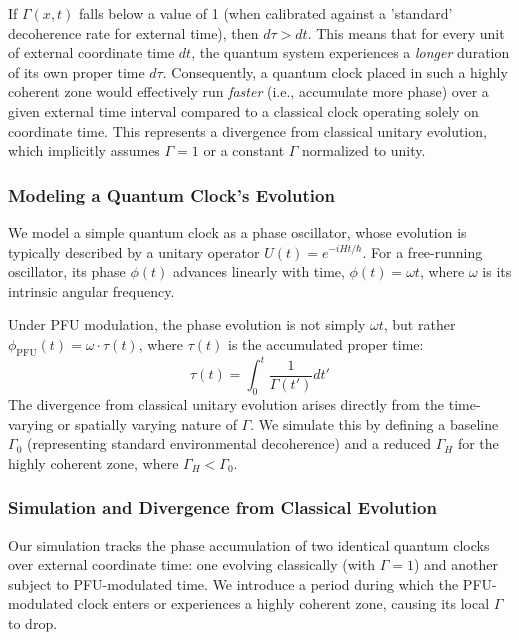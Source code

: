\documentclass[12pt,a4paper]{article}
\numberwithin{equation}{section}
\begin{document}
If $\Gamma(x, t)$ falls below a value of 1 (when calibrated against a 'standard' decoherence rate for external time), then $d\tau > dt$. This means that for every unit of external coordinate time $dt$, the quantum system experiences a \textit{longer} duration of its own proper time $d\tau$. Consequently, a quantum clock placed in such a highly coherent zone would effectively run \textit{faster} (i.e., accumulate more phase) over a given external time interval compared to a classical clock operating solely on coordinate time. This represents a divergence from classical unitary evolution, which implicitly assumes $\Gamma=1$ or a constant $\Gamma$ normalized to unity.

\subsubsection{Modeling a Quantum Clock's Evolution}
We model a simple quantum clock as a phase oscillator, whose evolution is typically described by a unitary operator $U(t) = e^{-iHt/\hbar}$. For a free-running oscillator, its phase $\phi(t)$ advances linearly with time, $\phi(t) = \omega t$, where $\omega$ is its intrinsic angular frequency.

Under PFU modulation, the phase evolution is not simply $\omega t$, but rather $\phi_{\text{PFU}}(t) = \omega \cdot \tau(t)$, where $\tau(t)$ is the accumulated proper time:
\begin{equation}
\tau(t) = \int_{0}^{t} \frac{1}{\Gamma(t')} dt'
\end{equation}
The divergence from classical unitary evolution arises directly from the time-varying or spatially varying nature of $\Gamma$. We simulate this by defining a baseline $\Gamma_0$ (representing standard environmental decoherence) and a reduced $\Gamma_H$ for the highly coherent zone, where $\Gamma_H < \Gamma_0$.

\subsubsection{Simulation and Divergence from Classical Evolution}
Our simulation tracks the phase accumulation of two identical quantum clocks over external coordinate time: one evolving classically (with $\Gamma=1$) and another subject to PFU-modulated time. We introduce a period during which the PFU-modulated clock enters or experiences a highly coherent zone, causing its local $\Gamma$ to drop.
\end{document}
